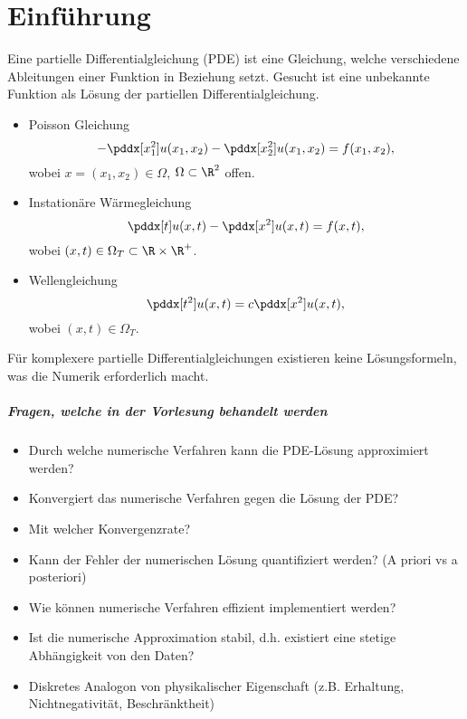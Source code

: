 \chapter{Einführung}

Eine partielle Differentialgleichung (PDE) ist eine Gleichung, welche verschiedene Ableitungen einer Funktion in Beziehung setzt.
Gesucht ist eine unbekannte Funktion als Lösung der partiellen Differentialgleichung.

\begin{ex}
	\begin{itemize}
		\item
			Poisson Gleichung
			\[
				- \pddx[x_1^2] u(x_1,x_2) - \pddx[x_2^2] u(x_1, x_2) = f(x_1, x_2),
			\]
			wobei $x = (x_1, x_2) \in \Omega$, $\Omega \subset \R^2$ offen.
		\item
			Instationäre Wärmegleichung
			\[
				\pddx[t] u(x,t) - \pddx[x^2] u(x,t) = f(x, t),
			\]
			wobei $(x, t) \in \Omega_T \subset \R \times \R^+$.
		\item
			Wellengleichung
			\[
				\pddx[t^2] u(x, t) = c \pddx[x^2] u(x,t),
			\]
			wobei $(x,t) \in \Omega_T$.
	\end{itemize}
\end{ex}

Für komplexere partielle Differentialgleichungen existieren keine Lösungsformeln, was die Numerik erforderlich macht.

\paragraph{Fragen, welche in der Vorlesung behandelt werden}

\begin{itemize}
	\item
		Durch welche numerische Verfahren kann die PDE-Lösung approximiert werden?
	\item
		Konvergiert das numerische Verfahren gegen die Lösung der PDE?
	\item
		Mit welcher Konvergenzrate?
	\item
		Kann der Fehler der numerischen Lösung quantifiziert werden? (A priori vs a posteriori)
	\item
		Wie können numerische Verfahren effizient implementiert werden?
	\item
		Ist die numerische Approximation stabil, d.h. existiert eine stetige Abhängigkeit von den Daten?
	\item
		Diskretes Analogon von physikalischer Eigenschaft (z.B. Erhaltung, Nichtnegativität, Beschränktheit)
\end{itemize}

